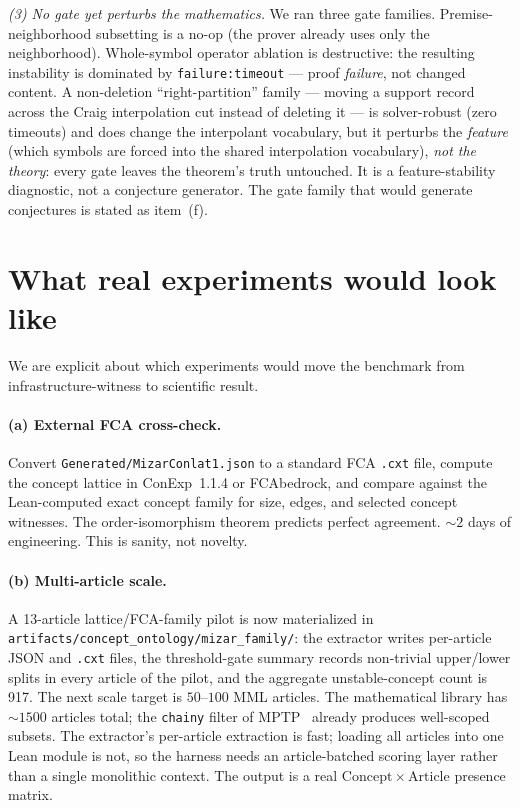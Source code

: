 \documentclass[]{article}
\newcommand{\lid}[1]{{\ttfamily\nolinkurl{#1}}}
\newcommand{\lpath}[1]{\texttt{\nolinkurl{#1}}}
\begin{document}
\emph{(3) No gate yet perturbs the mathematics.} We ran three gate families.
Premise-neighborhood subsetting is a no-op (the prover already uses only the
neighborhood). Whole-symbol operator ablation is destructive: the resulting
instability is dominated by \lid{failure:timeout} --- proof \emph{failure}, not
changed content. A non-deletion ``right-partition'' family --- moving a support
record across the Craig interpolation cut instead of deleting it --- is
solver-robust (zero timeouts) and does change the interpolant vocabulary, but it
perturbs the \emph{feature} (which symbols are forced into the shared interpolation
vocabulary), \emph{not the theory}: every gate leaves the theorem's truth untouched.
It is a feature-stability diagnostic, not a conjecture generator. The gate family
that would generate conjectures is stated as item~(f).

\section{What real experiments would look like}\label{sec:roadmap}

We are explicit about which experiments would move the benchmark from
infrastructure-witness to scientific result.

\paragraph{(a) External FCA cross-check.} Convert
\lid{Generated/MizarConlat1.json} to a standard FCA \lid{.cxt} file, compute
the concept lattice in ConExp~1.1.4 or FCAbedrock, and compare against the
Lean-computed exact concept family for size, edges, and selected concept
witnesses. The order-isomorphism theorem predicts perfect agreement. ${\sim}2$ days
of engineering. This is sanity, not novelty.

\paragraph{(b) Multi-article scale.} A 13-article lattice/FCA-family pilot is now
materialized in \lpath{artifacts/concept\_ontology/mizar\_family/}: the extractor
writes per-article JSON and \lid{.cxt} files, the threshold-gate summary records
non-trivial upper/lower splits in every article of the pilot, and the aggregate
unstable-concept count is 917. The next scale target is $50$--$100$ MML articles.
The mathematical library has ${\sim}1500$ articles total; the
\lid{chainy} filter of MPTP~\cite{urban2003mptp} already produces well-scoped
subsets. The extractor's per-article extraction is fast; loading all articles into
one Lean module is not, so the harness needs an article-batched scoring layer rather
than a single monolithic context. The output is a real
$\mathrm{Concept} \times \mathrm{Article}$ presence matrix.
\end{document}
